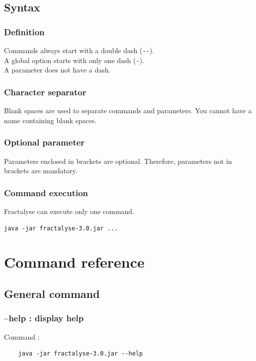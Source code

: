 \documentclass[a4paper,10pt]{report}
\begin{document}
\section{Syntax}
\subsection{Definition}
Commands always start with a double dash (\verb|--|).\\
A global option starts with only one dash (\verb|-|).\\
A parameter does not have a dash.\\
\subsection{Character separator}
Blank spaces are used to separate commands and parameters. You cannot have a name containing blank spaces.\\

\subsection{Optional parameter}
Parameters enclosed in brackets are optional. 
Therefore, parameters not in brackets are mandatory.


\subsection{Command execution}
Fractalyse can execute only one command.

\begin{Verbatim}
java -jar fractalyse-3.0.jar ...
\end{Verbatim}




\chapter{Command reference}
\section{General command}
\subsection{--help : display help}
Command :
\begin{Verbatim}
	java -jar fractalyse-3.0.jar --help
\end{Verbatim}
\end{document}
